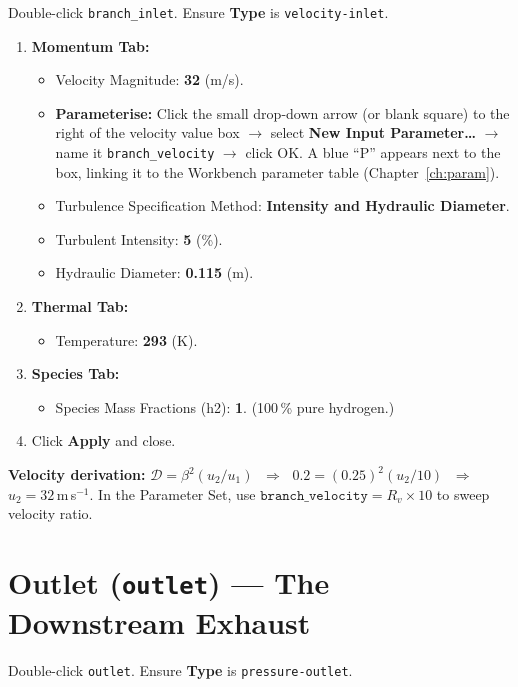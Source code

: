 \documentclass[12pt,a4paper]{report}
\begin{document}
Double-click \texttt{branch\_inlet}.  Ensure \textbf{Type} is
\texttt{velocity-inlet}.

\begin{enumerate}
  \item \textbf{Momentum Tab:}
  \begin{itemize}
    \item Velocity Magnitude: \textbf{32} (m/s).
    \item \textbf{Parameterise:} Click the small drop-down arrow (or
          blank square) to the right of the velocity value box
          $\rightarrow$ select \textbf{New Input Parameter\ldots}
          $\rightarrow$ name it \texttt{branch\_velocity} $\rightarrow$
          click OK.  A blue ``P'' appears next to the box, linking it to
          the Workbench parameter table
          (Chapter~\ref{ch:param}).
    \item Turbulence Specification Method: \textbf{Intensity and
          Hydraulic Diameter}.
    \item Turbulent Intensity: \textbf{5} (\%).
    \item Hydraulic Diameter: \textbf{0.115} (m).
  \end{itemize}
  \item \textbf{Thermal Tab:}
  \begin{itemize}
    \item Temperature: \textbf{293} (K).
  \end{itemize}
  \item \textbf{Species Tab:}
  \begin{itemize}
    \item Species Mass Fractions (h2): \textbf{1}.
          \quad(100\,\% pure hydrogen.)
  \end{itemize}
  \item Click \textbf{Apply} and close.
\end{enumerate}

\noindent\textbf{Velocity derivation:}
$\mathcal{D} = \beta^2 (u_2/u_1)$ $\;\Rightarrow\;$
$0.2 = (0.25)^2 (u_2/10)$ $\;\Rightarrow\;$ $u_2 = 32$\,m\,s$^{-1}$.
In the Parameter Set, use
$\texttt{branch\_velocity} = R_v \times 10$ to sweep velocity ratio.

\section{Outlet (\texttt{outlet}) --- The Downstream Exhaust}

Double-click \texttt{outlet}.  Ensure \textbf{Type} is
\texttt{pressure-outlet}.
\end{document}
